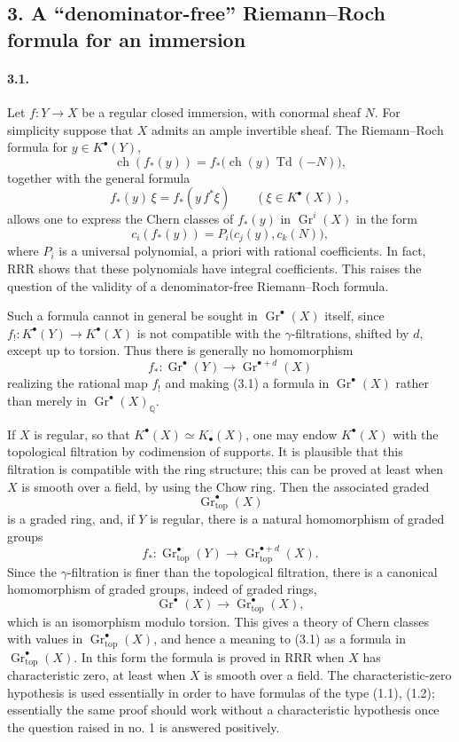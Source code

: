\documentclass[11pt]{article}
\theoremstyle{plain}
\theoremstyle{definition}
\theoremstyle{remark}
\newcommand{\QQ}{\mathbb Q}
\DeclareMathOperator{\Gr}{Gr}
\newcommand{\longto}{\longrightarrow}
\providecommand{\ch}{\operatorname{ch}}
\providecommand{\Td}{\operatorname{Td}}
\providecommand{\topf}{\mathrm{top}}
\begin{document}
\subsection*{3. A ``denominator-free'' Riemann--Roch formula for an immersion}

\paragraph{3.1.}
Let $f:Y\to X$ be a regular closed immersion, with conormal sheaf $N$. For simplicity suppose that $X$ admits an ample invertible sheaf. The Riemann--Roch formula for $y\in K^\bullet(Y)$,
\[
\ch(f_*(y))=f_*\bigl(\ch(y)\Td(-N)\bigr),
\]
together with the general formula
\[
f_*(y)\,\xi=f_*(y\,f^*\xi)\qquad(\xi\in K^\bullet(X)),
\]
allows one to express the Chern classes of $f_*(y)$ in $\Gr^i(X)$ in the form
\[
c_i(f_*(y))=P_i\bigl(c_j(y),c_k(N)\bigr),
\tag{3.1}
\]
where $P_i$ is a universal polynomial, a priori with rational coefficients. In fact, RRR shows that these polynomials have integral coefficients. This raises the question of the validity of a denominator-free Riemann--Roch formula.

Such a formula cannot in general be sought in $\Gr^\bullet(X)$ itself, since $f_!:K^\bullet(Y)\to K^\bullet(X)$ is not compatible with the $\gamma$-filtrations, shifted by $d$, except up to torsion. Thus there is generally no homomorphism
\[
f_*:\Gr^\bullet(Y)\to\Gr^{\bullet+d}(X)
\]
realizing the rational map $f_!$ and making (3.1) a formula in $\Gr^\bullet(X)$ rather than merely in $\Gr^\bullet(X)_\QQ$.

If $X$ is regular, so that $K^\bullet(X)\simeq K_\bullet(X)$, one may endow $K^\bullet(X)$ with the topological filtration by codimension of supports. It is plausible that this filtration is compatible with the ring structure; this can be proved at least when $X$ is smooth over a field, by using the Chow ring. Then the associated graded
\[
\Gr^\bullet_{\topf}(X)
\]
is a graded ring, and, if $Y$ is regular, there is a natural homomorphism of graded groups
\[
f_*:\Gr^\bullet_{\topf}(Y)\longto \Gr^{\bullet+d}_{\topf}(X).
\]
Since the $\gamma$-filtration is finer than the topological filtration, there is a canonical homomorphism of graded groups, indeed of graded rings,
\[
\Gr^\bullet(X)\longto \Gr^\bullet_{\topf}(X),
\]
which is an isomorphism modulo torsion. This gives a theory of Chern classes with values in $\Gr^\bullet_{\topf}(X)$, and hence a meaning to (3.1) as a formula in $\Gr^\bullet_{\topf}(X)$. In this form the formula is proved in RRR when $X$ has characteristic zero, at least when $X$ is smooth over a field. The characteristic-zero hypothesis is used essentially in order to have formulas of the type (1.1), (1.2); essentially the same proof should work without a characteristic hypothesis once the question raised in no. 1 is answered positively.
\end{document}

